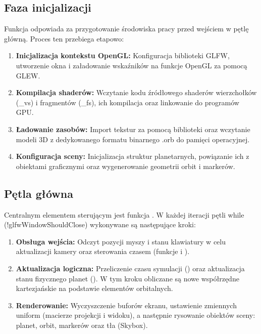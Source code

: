         \subsection{Faza inicjalizacji}
         Funkcja  odpowiada za przygotowanie środowiska pracy przed wejściem w pętlę główną. 
         Proces ten przebiega etapowo:

         \begin{enumerate}
         \item \textbf{Inicjalizacja kontekstu OpenGL:} Konfiguracja biblioteki GLFW, utworzenie okna i załadowanie wskaźników na funkcje OpenGL za pomocą GLEW.
         \item \textbf{Kompilacja shaderów:} Wczytanie kodu źródłowego shaderów wierzchołków (\_vs) i fragmentów (\_fs), ich kompilacja oraz linkowanie do programów GPU.
         \item \textbf{Ładowanie zasobów:} Import tekstur za pomocą biblioteki  oraz wczytanie modeli 3D z dedykowanego formatu binarnego .orb do pamięci operacyjnej.
         \item \textbf{Konfiguracja sceny:} Inicjalizacja struktur planetarnych, powiązanie ich z obiektami graficznymi oraz wygenerowanie geometrii orbit i markerów.
         \end{enumerate}

        \subsection{Pętla główna}
         Centralnym elementem sterującym jest funkcja . W każdej iteracji pętli while (!glfwWindowShouldClose) wykonywane są następujące kroki:

         \begin{enumerate}
         \item \textbf{Obsługa wejścia:} Odczyt pozycji myszy i stanu klawiatury w celu aktualizacji kamery oraz sterowania czasem (funkcje  i ).
         \item \textbf{Aktualizacja logiczna:} Przeliczenie czasu symulacji () oraz aktualizacja stanu fizycznego planet (). W tym kroku obliczane są nowe współrzędne kartezjańskie na podstawie elementów orbitalnych.
         \item \textbf{Renderowanie:} Wyczyszczenie buforów ekranu, ustawienie zmiennych uniform (macierze projekcji i widoku), a następnie rysowanie obiektów sceny: planet, orbit, markerów oraz tła (Skybox).
         \end{enumerate}

